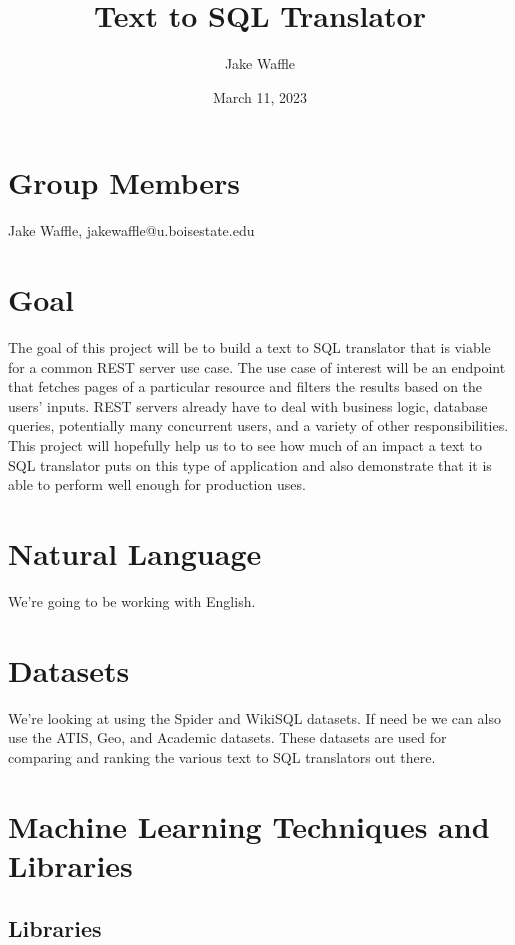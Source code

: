 \documentclass{article}
\title{Text to SQL Translator}
\author{Jake Waffle}
\date{March 11, 2023}
\begin{document}
\maketitle

\section*{Group Members}

Jake Waffle, jakewaffle@u.boisestate.edu

\section*{Goal}

The goal of this project will be to build a text to SQL translator that is viable for a common REST server use case.
The use case of interest will be an endpoint that fetches pages of a particular resource and filters the results based on the users' inputs.
REST servers already have to deal with business logic, database queries, potentially many concurrent users, and a variety of other responsibilities.
This project will hopefully help us to to see how much of an impact a text to SQL translator puts on this type of application and also demonstrate that it is able to perform well enough for production uses.

\section*{Natural Language}

We're going to be working with English.

\section*{Datasets}

We're looking at using the Spider and WikiSQL datasets. If need be we can also use the ATIS, Geo, and Academic datasets.
These datasets are used for comparing and ranking the various text to SQL translators out there.

\section*{Machine Learning Techniques and Libraries}

\subsection*{Libraries}
\end{document}
